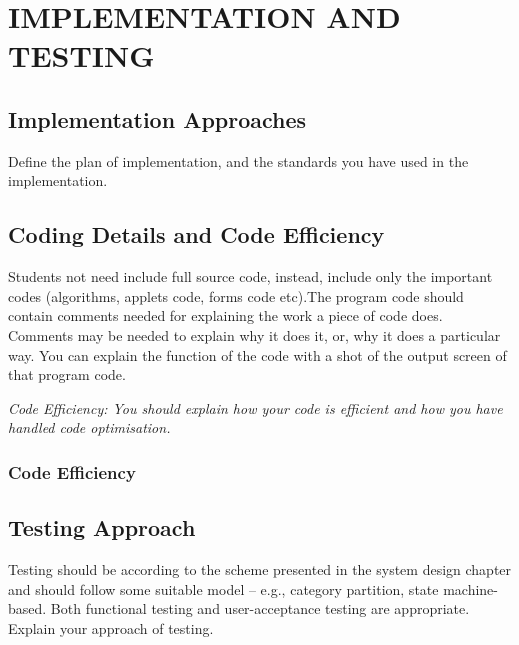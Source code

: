 
\chapter{IMPLEMENTATION AND TESTING} %

\label{Chapter5} %



\section{Implementation Approaches}
Define the plan of implementation, and the standards you have used in the implementation.
\section{Coding Details and Code Efficiency}
Students not need include full source code, instead, include only the important codes (algorithms, applets code, forms code etc).The program code should contain comments needed for explaining the work a piece of code does. Comments may be needed to explain why it does it, or, why it does a particular way. You can explain the function of the code with a shot of the output screen of that program code.

\textit{Code Efficiency: You should explain how your code is efficient and how you have handled code optimisation.}

\subsection{Code Efficiency}

\section{Testing Approach}
Testing should be according to the scheme presented in the system design chapter and should follow some suitable model – e.g., category partition, state machine-based. Both functional testing and user-acceptance testing are appropriate. Explain your approach of testing.

